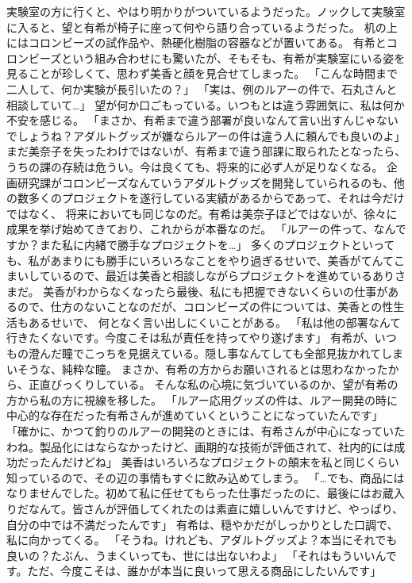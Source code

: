 実験室の方に行くと、やはり明かりがついているようだった。ノックして実験室に入ると、望と有希が椅子に座って何やら語り合っているようだった。
机の上にはコロンビーズの試作品や、熱硬化樹脂の容器などが置いてある。
有希とコロンビーズという組み合わせにも驚いたが、そもそも、有希が実験室にいる姿を見ることが珍しくて、思わず美香と顔を見合せてしまった。
「こんな時間まで二人して、何か実験が長引いたの？」
「実は、例のルアーの件で、石丸さんと相談していて…」
望が何か口ごもっている。いつもとは違う雰囲気に、私は何か不安を感じる。
「まさか、有希まで違う部署が良いなんて言い出すんじゃないでしょうね？アダルトグッズが嫌ならルアーの件は違う人に頼んでも良いのよ」
まだ美奈子を失ったわけではないが、有希まで違う部課に取られたとなったら、うちの課の存続は危うい。今は良くても、将来的に必ず人が足りなくなる。
企画研究課がコロンビーズなんていうアダルトグッズを開発していられるのも、他の数多くのプロジェクトを遂行している実績があるからであって、それは今だけではなく、
将来においても同じなのだ。有希は美奈子ほどではないが、徐々に成果を挙げ始めてきており、これからが本番なのだ。
「ルアーの件って、なんですか？また私に内緒で勝手なプロジェクトを…」
多くのプロジェクトといっても、私があまりにも勝手にいろいろなことをやり過ぎるせいで、美香がてんてこまいしているので、最近は美香と相談しながらプロジェクトを進めているありさまだ。
美香がわからなくなったら最後、私にも把握できないくらいの仕事があるので、仕方のないことなのだが、コロンビーズの件については、美香との性生活もあるせいで、
何となく言い出しにくいことがある。
「私は他の部署なんて行きたくないです。今度こそは私が責任を持ってやり遂げます」
有希が、いつもの澄んだ瞳でこっちを見据えている。隠し事なんてしても全部見抜かれてしまいそうな、純粋な瞳。
まさか、有希の方からお願いされるとは思わなかったから、正直びっくりしている。
そんな私の心境に気づいているのか、望が有希の方から私の方に視線を移した。
「ルアー応用グッズの件は、ルアー開発の時に中心的な存在だった有希さんが進めていくということになっていたんです」
「確かに、かつて釣りのルアーの開発のときには、有希さんが中心になっていたわね。製品化にはならなかったけど、画期的な技術が評価されて、社内的には成功だったんだけどね」
美香はいろいろなプロジェクトの顛末を私と同じくらい知っているので、その辺の事情もすぐに飲み込めてしまう。
「…でも、商品にはなりませんでした。初めて私に任せてもらった仕事だったのに、最後にはお蔵入りだなんて。皆さんが評価してくれたのは素直に嬉しいんですけど、やっぱり、自分の中では不満だったんです」
有希は、穏やかだがしっかりとした口調で、私に向かってくる。
「そうね。けれども、アダルトグッズよ？本当にそれでも良いの？たぶん、うまくいっても、世には出ないわよ」
「それはもういいんです。ただ、今度こそは、誰かが本当に良いって思える商品にしたいんです」
